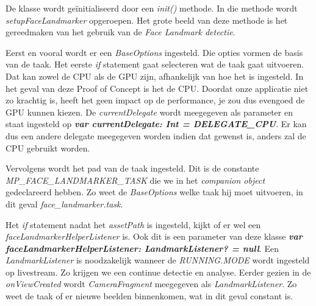 De klasse wordt geïnitialiseerd door een \emph{init()} methode. In die methode wordt \emph{setupFaceLandmarker} opgeroepen. Het grote beeld van deze methode is het gereedmaken van het gebruik van de \emph{Face Landmark detectie}.

Eerst en vooral wordt er een \emph{BaseOptions} ingesteld. Die opties vormen de basis van de taak. Het eerste \emph{if} statement gaat selecteren wat de taak gaat uitvoeren. Dat kan zowel de CPU als de GPU zijn, afhankelijk van hoe het is ingesteld. In het geval van deze Proof of Concept is het de CPU. Doordat onze applicatie niet zo krachtig is, heeft het geen impact op de performance, je zou dus evengoed de GPU kunnen kiezen. De \emph{currentDelegate} wordt meegegeven als parameter en staat ingesteld op \textbf{\emph{var currentDelegate: Int = DELEGATE\_CPU}}. Er kan dus een andere delegate meegegeven worden indien dat gewenst is, anders zal de CPU gebruikt worden.

Vervolgens wordt het pad van de taak ingesteld. Dit is de constante \emph{MP\_FACE\_LANDMARKER\_TASK} die we in het \emph{companion object} gedeclareerd hebben. Zo weet de \emph{BaseOptions} welke taak hij moet uitvoeren, in dit geval \emph{face\_landmarker.task}.

Het \emph{if} statement nadat het \emph{assetPath} is ingesteld, kijkt of er wel een \emph{faceLandmarkerHelperListener} is. Ook dit is een parameter van deze klasse \textbf{\emph{var faceLandmarkerHelperListener: LandmarkListener? = null}}. Een \emph{LandmarkListener} is noodzakelijk wanneer de \emph{RUNNING.MODE} wordt ingesteld op livestream. Zo krijgen we een continue detectie en analyse. Eerder gezien in de \emph{onViewCreated} wordt \emph{CameraFragment} meegegeven als \emph{LandmarkListener}. Zo weet de taak of er nieuwe beelden binnenkomen, wat in dit geval constant is.

